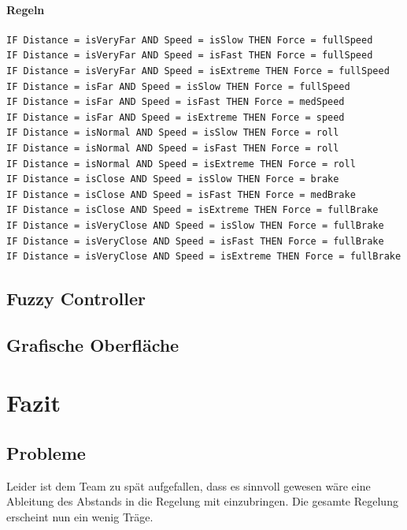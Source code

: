 \documentclass[12pt,a4paper,bibliography=totocnumbered,listof=totocnumbered, abstracton]{scrartcl}
\theoremstyle{Umgebung}
\begin{document}
\paragraph{Regeln}

\begin{lstlisting}
IF Distance = isVeryFar AND Speed = isSlow THEN Force = fullSpeed
IF Distance = isVeryFar AND Speed = isFast THEN Force = fullSpeed
IF Distance = isVeryFar AND Speed = isExtreme THEN Force = fullSpeed
IF Distance = isFar AND Speed = isSlow THEN Force = fullSpeed
IF Distance = isFar AND Speed = isFast THEN Force = medSpeed
IF Distance = isFar AND Speed = isExtreme THEN Force = speed
IF Distance = isNormal AND Speed = isSlow THEN Force = roll
IF Distance = isNormal AND Speed = isFast THEN Force = roll
IF Distance = isNormal AND Speed = isExtreme THEN Force = roll
IF Distance = isClose AND Speed = isSlow THEN Force = brake
IF Distance = isClose AND Speed = isFast THEN Force = medBrake
IF Distance = isClose AND Speed = isExtreme THEN Force = fullBrake
IF Distance = isVeryClose AND Speed = isSlow THEN Force = fullBrake
IF Distance = isVeryClose AND Speed = isFast THEN Force = fullBrake
IF Distance = isVeryClose AND Speed = isExtreme THEN Force = fullBrake

\end{lstlisting}

\subsection{Fuzzy Controller}

\subsection{Grafische Oberfläche}


\section{Fazit}

\subsection{Probleme}

Leider ist dem Team zu spät aufgefallen, dass es sinnvoll gewesen wäre eine Ableitung des Abstands in die Regelung mit einzubringen. Die gesamte Regelung erscheint nun ein wenig Träge.

\end{document}

